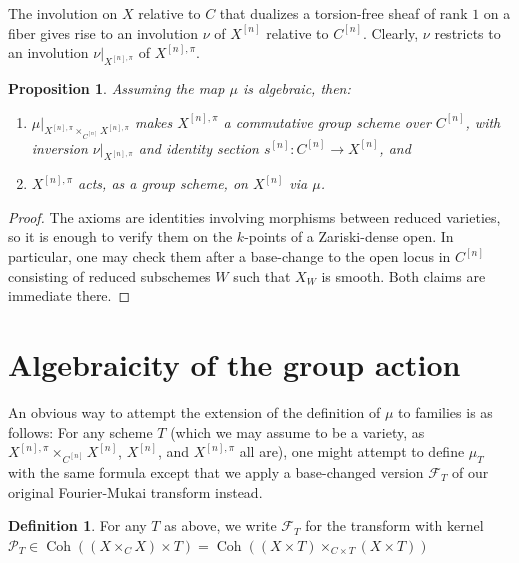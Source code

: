 \documentclass{amsart}
\theoremstyle{plain}
\newtheorem{proposition}[theorem]{Proposition}
\theoremstyle{definition}
\newtheorem{definition}[theorem]{Definition}
\theoremstyle{remark}
\begin{document}
    The involution on $X$ relative to $C$ that dualizes a torsion-free sheaf of rank $1$ on a fiber gives rise to an involution $\nu$ of $X^{[n]}$ relative to $C^{[n]}$.
    Clearly, $\nu$ restricts to an involution $\nu|_{X^{[n],\pi}}$ of $X^{[n],\pi}$.
    \begin{proposition}
        Assuming the map $\mu$ is algebraic, then:
        \begin{enumerate}
            \item $\mu|_{X^{[n],\pi}\times_{C^{[n]}} X^{[n],\pi}}$ makes $X^{[n],\pi}$ a commutative group scheme over $C^{[n]}$, with inversion $\nu|_{X^{[n],\pi}}$ and identity section $s^{[n]}:C^{[n]}\to X^{[n]}$, and
            \item $X^{[n],\pi}$ acts, as a group scheme, on $X^{[n]}$ via $\mu$.
        \end{enumerate}
    \end{proposition}
    \begin{proof}
        The axioms are identities involving morphisms between reduced varieties, so it is enough to verify them on the $k$-points of a Zariski-dense open.
        In particular, one may check them after a base-change to the open locus in $C^{[n]}$ consisting of reduced subschemes $W$ such that $X_W$ is smooth.
        Both claims are immediate there.
    \end{proof}
    \section{Algebraicity of the group action}\label{ss:algebraicity}
    An obvious way to attempt the extension of the definition of $\mu$ to families is as follows:
    For any scheme $T$ (which we may assume to be a variety, as $X^{[n],\pi}\times_{C^{[n]}}X^{[n]}$, $X^{[n]}$, and $X^{[n],\pi}$ all are), one might attempt to define $\mu_T$ with the same formula except that we apply a base-changed version $\mathcal F_T$ of our original Fourier-Mukai transform instead.
    \begin{definition}
        For any $T$ as above, we write $\mathcal F_T$ for the transform with kernel $\mathcal P_T\in\operatorname{Coh}((X\times_CX)\times T) =\operatorname{Coh}((X\times T)\times_{C\times T}(X\times T))$
    \end{definition}
\end{document}
